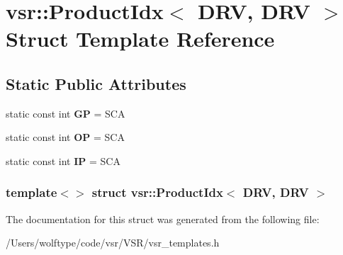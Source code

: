 \hypertarget{structvsr_1_1_product_idx_3_01_d_r_v_00_01_d_r_v_01_4}{\section{vsr\-:\-:Product\-Idx$<$ D\-R\-V, D\-R\-V $>$ Struct Template Reference}
\label{structvsr_1_1_product_idx_3_01_d_r_v_00_01_d_r_v_01_4}
}
\subsection*{Static Public Attributes}
\begin{DoxyCompactItemize}
\item 
\hypertarget{structvsr_1_1_product_idx_3_01_d_r_v_00_01_d_r_v_01_4_a16f5ef0b81e586a5a34db51fc564a3a5}{static const int {\bfseries G\-P} = S\-C\-A}\label{structvsr_1_1_product_idx_3_01_d_r_v_00_01_d_r_v_01_4_a16f5ef0b81e586a5a34db51fc564a3a5}

\item 
\hypertarget{structvsr_1_1_product_idx_3_01_d_r_v_00_01_d_r_v_01_4_a5cdb8b6aab1af877c24081107f7e4ebf}{static const int {\bfseries O\-P} = S\-C\-A}\label{structvsr_1_1_product_idx_3_01_d_r_v_00_01_d_r_v_01_4_a5cdb8b6aab1af877c24081107f7e4ebf}

\item 
\hypertarget{structvsr_1_1_product_idx_3_01_d_r_v_00_01_d_r_v_01_4_a49e0426968a5dd9e7009378cb7320e90}{static const int {\bfseries I\-P} = S\-C\-A}\label{structvsr_1_1_product_idx_3_01_d_r_v_00_01_d_r_v_01_4_a49e0426968a5dd9e7009378cb7320e90}

\end{DoxyCompactItemize}
\subsubsection*{template$<$$>$ struct vsr\-::\-Product\-Idx$<$ D\-R\-V, D\-R\-V $>$}



The documentation for this struct was generated from the following file\-:\begin{DoxyCompactItemize}
\item 
/\-Users/wolftype/code/vsr/\-V\-S\-R/vsr\-\_\-templates.\-h\end{DoxyCompactItemize}
